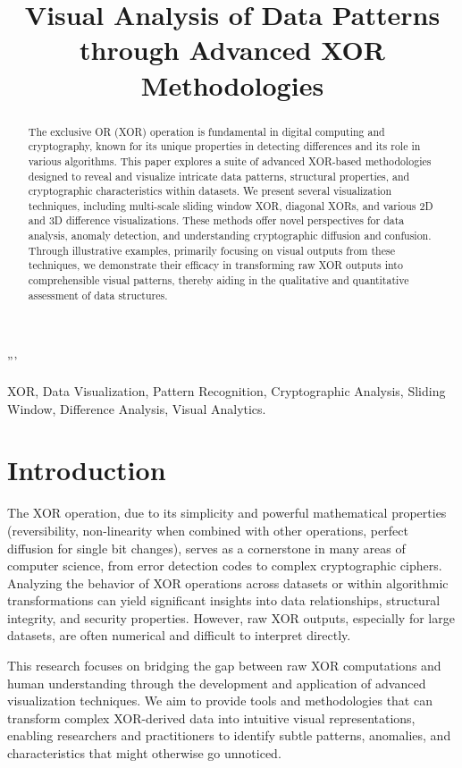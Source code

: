 '''\documentclass[conference]{IEEEtran}
\title{Visual Analysis of Data Patterns through Advanced XOR Methodologies}
\author{
    \IEEEauthorblockN{A. N. Author}
    \IEEEauthorblockA{Research Group\\
    Institution Name\\
    City, Country\\
    email@example.com}
}
\begin{document}
\maketitle

\begin{abstract}
The exclusive OR (XOR) operation is fundamental in digital computing and cryptography, known for its unique properties in detecting differences and its role in various algorithms. This paper explores a suite of advanced XOR-based methodologies designed to reveal and visualize intricate data patterns, structural properties, and cryptographic characteristics within datasets. We present several visualization techniques, including multi-scale sliding window XOR, diagonal XORs, and various 2D and 3D difference visualizations. These methods offer novel perspectives for data analysis, anomaly detection, and understanding cryptographic diffusion and confusion. Through illustrative examples, primarily focusing on visual outputs from these techniques, we demonstrate their efficacy in transforming raw XOR outputs into comprehensible visual patterns, thereby aiding in the qualitative and quantitative assessment of data structures.
\end{abstract}

\begin{IEEEkeywords}
XOR, Data Visualization, Pattern Recognition, Cryptographic Analysis, Sliding Window, Difference Analysis, Visual Analytics.
\end{IEEEkeywords}

\section{Introduction}
The XOR operation, due to its simplicity and powerful mathematical properties (reversibility, non-linearity when combined with other operations, perfect diffusion for single bit changes), serves as a cornerstone in many areas of computer science, from error detection codes to complex cryptographic ciphers. Analyzing the behavior of XOR operations across datasets or within algorithmic transformations can yield significant insights into data relationships, structural integrity, and security properties. However, raw XOR outputs, especially for large datasets, are often numerical and difficult to interpret directly.

This research focuses on bridging the gap between raw XOR computations and human understanding through the development and application of advanced visualization techniques. We aim to provide tools and methodologies that can transform complex XOR-derived data into intuitive visual representations, enabling researchers and practitioners to identify subtle patterns, anomalies, and characteristics that might otherwise go unnoticed.
\end{document}
